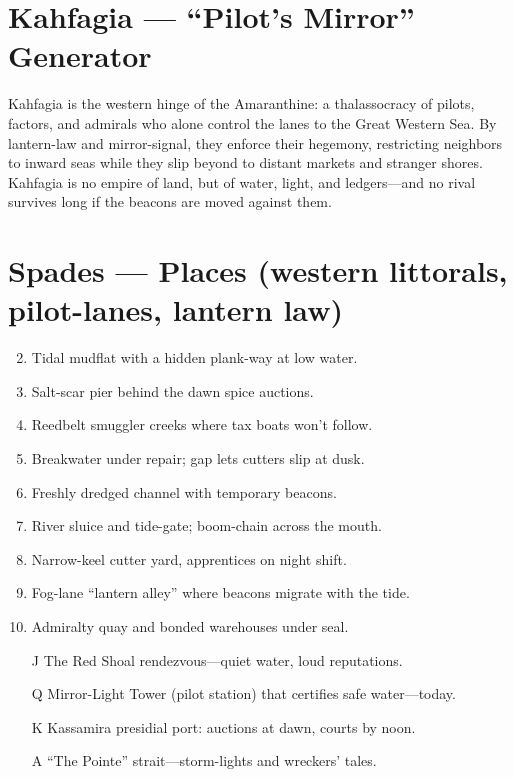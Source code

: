 \section{Kahfagia --- ``Pilot's Mirror'' Generator}
\label{chap:kahfagia}

Kahfagia is the western hinge of the Amaranthine: a thalassocracy of pilots, factors, and admirals who alone control the lanes to the Great Western Sea. By lantern-law and mirror-signal, they enforce their hegemony, restricting neighbors to inward seas while they slip beyond to distant markets and stranger shores. Kahfagia is no empire of land, but of water, light, and ledgers---and no rival survives long if the beacons are moved against them.

\section*{Spades --- Places (western littorals, pilot-lanes, lantern law)}
\label{sec:kahfagia-places}
\begin{enumerate}
\setcounter{enumi}{1}
\item Tidal mudflat with a hidden plank-way at low water.
\item Salt-scar pier behind the dawn spice auctions.
\item Reedbelt smuggler creeks where tax boats won't follow.
\item Breakwater under repair; gap lets cutters slip at dusk.
\item Freshly dredged channel with temporary beacons.
\item River sluice and tide-gate; boom-chain across the mouth.
\item Narrow-keel cutter yard, apprentices on night shift.
\item Fog-lane ``lantern alley'' where beacons migrate with the tide.
\item Admiralty quay and bonded warehouses under seal.
\item[J] The Red Shoal rendezvous---quiet water, loud reputations.
\item[Q] Mirror-Light Tower (pilot station) that certifies safe water---today.
\item[K] Kassamira presidial port: auctions at dawn, courts by noon.
\item[A] ``The Pointe'' strait---storm-lights and wreckers' tales.
\end{enumerate}


